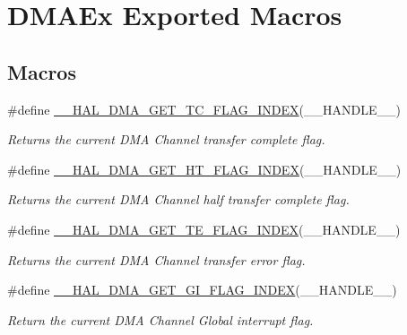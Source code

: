 \hypertarget{group___d_m_a_ex___exported___macros}{}\section{D\+M\+A\+Ex Exported Macros}
\label{group___d_m_a_ex___exported___macros}
\subsection*{Macros}
\begin{DoxyCompactItemize}
\item 
\#define \hyperlink{group___d_m_a_ex___exported___macros_gae3feef5ea50ff13a6a5b98cb353c87b0}{\+\_\+\+\_\+\+H\+A\+L\+\_\+\+D\+M\+A\+\_\+\+G\+E\+T\+\_\+\+T\+C\+\_\+\+F\+L\+A\+G\+\_\+\+I\+N\+D\+EX}(\+\_\+\+\_\+\+H\+A\+N\+D\+L\+E\+\_\+\+\_\+)
\begin{DoxyCompactList}\small\item\em Returns the current D\+MA Channel transfer complete flag. \end{DoxyCompactList}\item 
\#define \hyperlink{group___d_m_a_ex___exported___macros_ga0095f5f3166a82bedc67744ac94acfba}{\+\_\+\+\_\+\+H\+A\+L\+\_\+\+D\+M\+A\+\_\+\+G\+E\+T\+\_\+\+H\+T\+\_\+\+F\+L\+A\+G\+\_\+\+I\+N\+D\+EX}(\+\_\+\+\_\+\+H\+A\+N\+D\+L\+E\+\_\+\+\_\+)
\begin{DoxyCompactList}\small\item\em Returns the current D\+MA Channel half transfer complete flag. \end{DoxyCompactList}\item 
\#define \hyperlink{group___d_m_a_ex___exported___macros_ga5e765bb3b1c5fc9f1b1abbbb764250bc}{\+\_\+\+\_\+\+H\+A\+L\+\_\+\+D\+M\+A\+\_\+\+G\+E\+T\+\_\+\+T\+E\+\_\+\+F\+L\+A\+G\+\_\+\+I\+N\+D\+EX}(\+\_\+\+\_\+\+H\+A\+N\+D\+L\+E\+\_\+\+\_\+)
\begin{DoxyCompactList}\small\item\em Returns the current D\+MA Channel transfer error flag. \end{DoxyCompactList}\item 
\#define \hyperlink{group___d_m_a_ex___exported___macros_ga718c628ea8c112c5b09bc61c52b86e75}{\+\_\+\+\_\+\+H\+A\+L\+\_\+\+D\+M\+A\+\_\+\+G\+E\+T\+\_\+\+G\+I\+\_\+\+F\+L\+A\+G\+\_\+\+I\+N\+D\+EX}(\+\_\+\+\_\+\+H\+A\+N\+D\+L\+E\+\_\+\+\_\+)
\begin{DoxyCompactList}\small\item\em Return the current D\+MA Channel Global interrupt flag. \end{DoxyCompactList}\item 

\end{DoxyCompactItemize}
